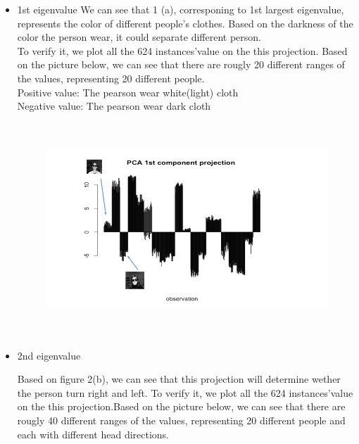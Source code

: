 \documentclass{article}
\begin{document}
\begin{itemize}
\item 1st eigenvalue
We can see that 1 (a), corresponing to 1st largest eigenvalue, represents the color of different people's clothes. Based on the darkness of the color the person wear, it could separate different person. \\

To verify it, we plot all the 624 instances'value on the this projection. Based on the picture below, we can see that there are rougly 20 different ranges of the values, representing 20 different people. \\

Positive value: The pearson wear white(light) cloth\\
Negative value: The pearson wear dark cloth\\

\begin{figure}[H]
\centering
\includegraphics[width=\linewidth, height=8cm]{Slide1}
\caption{}
\label{fig:larynx}
\end{figure}

\item 2nd eigenvalue

Based on figure 2(b), we can see that this projection will determine wether the person turn right and left. To verify it, we plot all the 624 instances'value on the this projection.Based on the picture below, we can see that there are rougly 40 different ranges of the values, representing 20 different people and each with different head directions.\\


\end{itemize}
\end{document}
